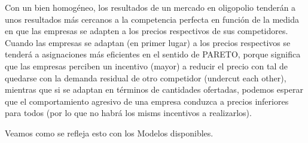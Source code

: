 \documentclass[10pt,a4paper]{article}
\begin{document}
Con un bien homogéneo, los resultados de un mercado en oligopolio tenderán a unos resultados más cercanos a la competencia perfecta en función de la medida en que las empresas se adapten a los precios respectivos de sus competidores. Cuando las empresas se adaptan (en primer lugar) a los precios respectivos se tenderá a asignaciones más eficientes en el sentido de PARETO, porque significa que las empresas perciben un incentivo (mayor) a reducir el precio con tal de quedarse con la demanda residual de otro competidor (undercut each other), mientras que si se adaptan en términos de cantidades ofertadas, podemos esperar que el comportamiento agresivo de una empresa conduzca a precios inferiores para todos (por lo que no habrá los misms incentivos a realizarlos).

Veamos como se refleja esto con los Modelos disponibles.
\end{document}
